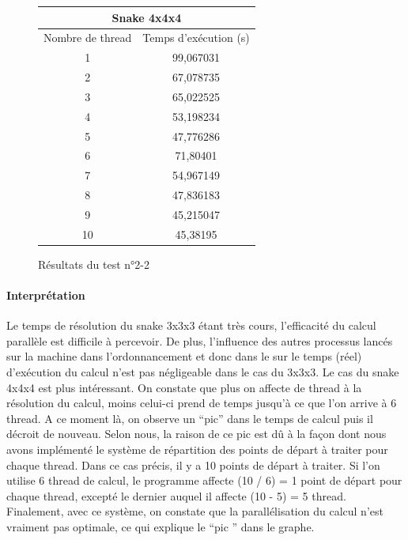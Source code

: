 \begin{figure}[h]
\begin{center}
\begin{tabular}{|*{2}{c|}}
\hline
\multicolumn{2}{|c|}{Snake 4x4x4} \\
\hline
Nombre de thread & Temps d’exécution (s) \\
\hline
1 & 99,067031 \\
\hline
2 & 67,078735 \\
\hline
3 & 65,022525 \\
\hline
4 & 53,198234 \\
\hline
5 & 47,776286 \\
\hline
6 & 71,80401 \\
\hline
7 & 54,967149 \\
\hline
8 & 47,836183 \\
\hline
9 & 45,215047 \\
\hline
10 & 45,38195 \\
\hline
\end{tabular}
\end{center}
\caption{Résultats du test n°2-2}
\end{figure}

\newpage

\paragraph{Interprétation} Le temps de résolution du snake 3x3x3 étant très cours, l'efficacité du calcul parallèle est difficile à percevoir. De plus, l'influence des autres processus lancés sur la machine dans l’ordonnancement et donc dans le sur le temps (réel) d'exécution du calcul n'est pas négligeable dans le cas du 3x3x3. Le cas du snake 4x4x4 est plus intéressant. On constate que plus on affecte de thread à la résolution du calcul, moins celui-ci prend de temps jusqu'à ce que l'on arrive à 6 thread. A ce moment là, on observe un ``pic'' dans le temps de calcul puis il décroit de nouveau. Selon nous, la raison de ce pic est dû à la façon dont nous avons implémenté le système de répartition des points de départ à traiter pour chaque thread. Dans ce cas précis, il y a 10 points de départ à traiter. Si l'on utilise 6 thread de calcul, le programme affecte (10 / 6) = 1 point de départ pour chaque thread, excepté le dernier auquel il affecte (10 - 5) = 5 thread. Finalement, avec ce système, on constate que la parallélisation du calcul n'est vraiment pas optimale, ce qui explique le ``pic '' dans le graphe.

